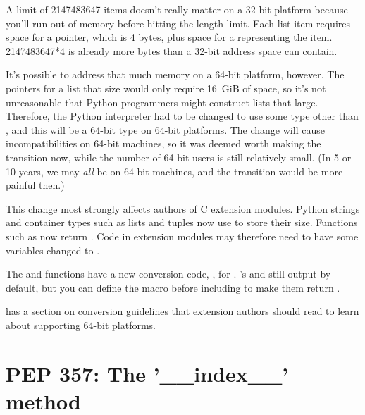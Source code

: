 \documentclass{howto}
\begin{document}
A limit of 2147483647 items doesn't really matter on a 32-bit platform
because you'll run out of memory before hitting the length limit.
Each list item requires space for a pointer, which is 4 bytes, plus
space for a  representing the item.  2147483647*4 is
already more bytes than a 32-bit address space can contain.

It's possible to address that much memory on a 64-bit platform,
however.  The pointers for a list that size would only require 16~GiB
of space, so it's not unreasonable that Python programmers might
construct lists that large.  Therefore, the Python interpreter had to
be changed to use some type other than , and this will be a
64-bit type on 64-bit platforms.  The change will cause
incompatibilities on 64-bit machines, so it was deemed worth making
the transition now, while the number of 64-bit users is still
relatively small.  (In 5 or 10 years, we may \emph{all} be on 64-bit
machines, and the transition would be more painful then.)

This change most strongly affects authors of C extension modules.  
Python strings and container types such as lists and tuples 
now use  to store their size.  
Functions such as  
now return .  Code in extension modules
may therefore need to have some variables changed to
.  

The  and  functions
have a new conversion code, , for .  
's  and  still output
 by default, but you can define the macro 
 before including  
to make them return .

 has a section on conversion guidelines that 
extension authors should read to learn about supporting 64-bit
platforms.

\begin{seealso}


\end{seealso}


\section{PEP 357: The '__index__' method\label{pep-357}}
\end{document}
